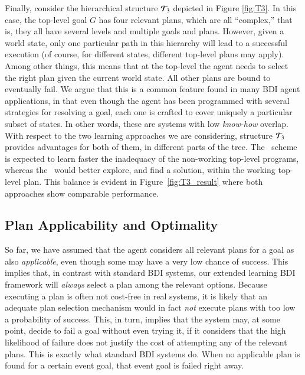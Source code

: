 Finally, consider the hierarchical structure ${\mathcal{T}}_3$ depicted in Figure
\ref{fig:T3}.
In this case, the top-level goal $G$ has four relevant plans, which are all
``complex,'' that is, they all have several levels and multiple goals and plans.
However, given a world state, only one particular path in this hierarchy will
lead to a successful execution (of course, for different states, different
top-level plans may apply). Among other things, this means that at the top-level
the agent needs to select the right plan given the current world state. All 
other plans are bound to eventually fail.
We argue that this is a common feature found in many BDI agent applications, in
that even though the agent has been programmed with several strategies for
resolving a goal, each one is crafted to cover uniquely a particular subset of
states. In other words, these are systems with low \emph{know-how} overlap.
With respect to the two learning approaches we are considering, structure ${\mathcal{T}}_3$
provides advantages for both of them, in different parts of the tree. The \CL\
scheme is expected to learn faster the inadequacy of the non-working top-level
programs, whereas the \BUL\ would better explore, and find a solution, within the
working top-level plan. This balance is evident in Figure~\ref{fig:T3_result} 
where both approaches show comparable performance.




\subsection{Plan Applicability and Optimality}

So far, we have assumed that the agent considers all relevant plans
for a goal as also \emph{applicable}, even though some may have a very
low chance of success.
This implies that, in contrast with standard BDI systems, our extended
learning BDI framework will \emph{always} select a plan among the relevant
options.
Because executing a plan is often not cost-free in real systems, it is likely
that an adequate plan selection mechanism would in fact \emph{not} execute plans
with too low a probability of success. This, in turn, implies that the system
may, at some point, decide to fail a goal without even trying it, if it
considers that the high likelihood of failure does not justify the
cost of attempting any of the relevant plans.
This is exactly what standard BDI systems do. When no applicable plan
is found for a certain event goal, that event goal is failed right away.


